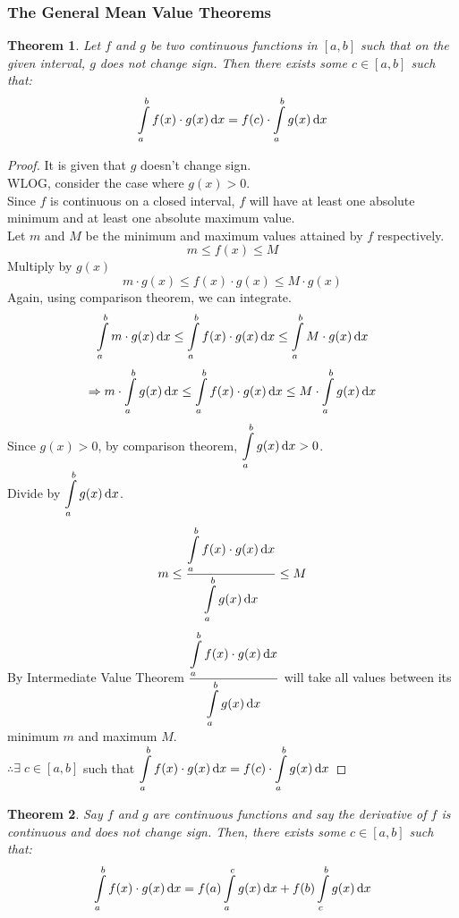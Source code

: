 \documentclass[14]{article}
\newtheorem{theorem}{Theorem}
\theoremstyle{definition}
\theoremstyle{case}
\begin{document}
\subsubsection{The General Mean Value Theorems}
\begin{theorem}
Let $f$ and $g$ be two continuous functions in $[a, b]$ such that on the given interval, $g$ does not change sign. Then there exists some  $c \in [a, b]$ such that:
\[\int\limits_a^b f(x) \cdot g(x) \dif x = f(c) \cdot \int\limits_a^b g(x) \dif x\]
\end{theorem}
\begin{proof}
It is given that $g$ doesn't change sign.\\
WLOG, consider the case where $g(x) > 0$.\\
Since $f$ is continuous on a closed interval, $f$ will have at least one absolute minimum and at least one absolute maximum value.\\
Let $m$ and $M$ be the minimum and maximum values attained by $f$ respectively.
\[m \leq f(x) \leq M\]
Multiply by $g(x)$
\[m \cdot g(x) \leq f(x) \cdot g(x) \leq M \cdot g(x)\]
Again, using comparison theorem, we can integrate.
\[\int\limits_a^b m \cdot g(x) \dif x \leq \int\limits_a^b f(x) \cdot g(x) \dif x \leq \int\limits_a^b M \cdot g(x) \dif x\]
\[\Rightarrow m \cdot \int\limits_a^b  g(x) \dif x \leq \int\limits_a^b f(x) \cdot g(x) \dif x \leq M \cdot \int\limits_a^b  g(x) \dif x\]
Since $g(x) > 0$, by comparison theorem, $\displaystyle\int\limits_a^b g(x) \dif x > 0$.\\
Divide by $\displaystyle\int\limits_a^b g(x) \dif x$.
\[m \leq \dfrac{\displaystyle\int\limits_a^b f(x) \cdot g(x) \dif x}{\displaystyle\int\limits_a^b g(x) \dif x} \leq M\]
By Intermediate Value Theorem $ \dfrac{\displaystyle\int\limits_a^b f(x) \cdot g(x) \dif x}{\displaystyle\int\limits_a^b g(x) \dif x}$ will take all values between its minimum $m$ and maximum $M$.\\ $\therefore\exists\; c \in [a, b]$ such that $\displaystyle \int\limits_a^b f(x) \cdot g(x) \dif x = f(c) \cdot \int\limits_a^b g(x) \dif x$
\end{proof}
\pagebreak
\begin{theorem}
Say $f$ and $g$ are continuous functions and say the derivative of $f$ is continuous and does not change sign. Then, there exists some $c \in [a, b]$ such that:
\[\int\limits_a^b f(x) \cdot g(x) \dif x = f(a) \int\limits_a^c g(x) \dif x + f(b) \int\limits_c^b g(x) \dif x\]
\end{theorem}
\end{document}
